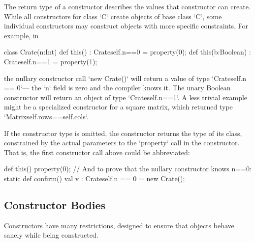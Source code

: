 The return type of a constructor describes the values that constructor can
create.  While all constructors for class \xcd`C` create objects of base class
\xcd`C`, some individual constructors may construct objects with more specific
constraints.    For example, in
\begin{xten}
class Crate(n:Int) {
  def this() : Crate{self.n==0} = { property(0); }
  def this(b:Boolean) : Crate{self.n==1} = { property(1); }
}
\end{xten}
%
\noindent
the nullary constructor call \xcd`new Crate()` will return a value of type 
\xcd`Crate{self.n == 0}`--- the \xcd`n` field is zero and the compiler knows
it.  The unary Boolean constructor will return an object of type 
\xcd`Crate{self.n==1}`.
A less trivial example might be a specialized constructor for a square matrix, 
which returned type \xcd`Matrix{self.rows==self.cols}`.  

If the constructor type is omitted, the constructor returns 
the type of its class, constrained by the actual parameters to the
\xcd`property` call in the constructor.  That is, the first constructor 
call above could be abbreviated:
\begin{xten}
  def this() { property(0); }
  // And to prove that the nullary constructor knows n==0: 
  static def confirm() {
    val v : Crate{self.n == 0} = new Crate();
  }
\end{xten}

\subsection{Constructor Bodies}

Constructors have many restrictions, designed to ensure that objects behave
sanely while being constructed.  






